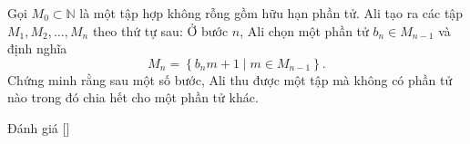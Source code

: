 \ifshowproblem
\begin{problem}\label{problem:IRN-2015-MO3-NP2}
	Gọi $M_0 \subset \mathbb{N}$ là một tập hợp không rỗng gồm hữu hạn phần tử.  
	Ali tạo ra các tập $M_1, M_2, \ldots, M_n$ theo thứ tự sau:  
	Ở bước $n$, Ali chọn một phần tử $b_n \in M_{n-1}$ và định nghĩa  
	\[
		M_n = \left\{ b_n m + 1 \mid m \in M_{n-1} \right\}.
	\]  
	Chứng minh rằng sau một số bước, Ali thu được một tập mà không có phần tử nào trong đó chia hết cho một phần tử khác.
\end{problem}
\fi

\ifshowinfo
Đánh giá [\textbf{}]\footnotemark
{}
\fi